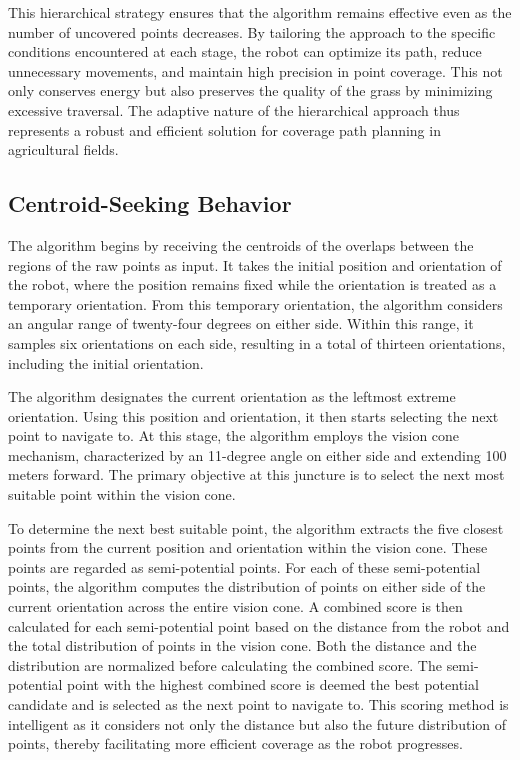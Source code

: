 \vspace{3mm}   


This hierarchical strategy ensures that the algorithm remains effective even as the number of uncovered points decreases. By tailoring the approach to the specific conditions encountered at each stage, the robot can optimize its path, reduce unnecessary movements, and maintain high precision in point coverage. This not only conserves energy but also preserves the quality of the grass by minimizing excessive traversal. The adaptive nature of the hierarchical approach thus represents a robust and efficient solution for coverage path planning in agricultural fields. 





\subsection{Centroid-Seeking Behavior}


The algorithm begins by receiving the centroids of the overlaps between the regions of the raw points as input. It takes the initial position and orientation of the robot, where the position remains fixed while the orientation is treated as a temporary orientation. From this temporary orientation, the algorithm considers an angular range of twenty-four degrees on either side. Within this range, it samples six orientations on each side, resulting in a total of thirteen orientations, including the initial orientation. 

\vspace{3mm}   

The algorithm designates the current orientation as the leftmost extreme orientation. Using this position and orientation, it then starts selecting the next point to navigate to. At this stage, the algorithm employs the vision cone mechanism, characterized by an 11-degree angle on either side and extending 100 meters forward. The primary objective at this juncture is to select the next most suitable point within the vision cone.

\vspace{3mm}  

To determine the next best suitable point, the algorithm extracts the five closest points from the current position and orientation within the vision cone. These points are regarded as semi-potential points. For each of these semi-potential points, the algorithm computes the distribution of points on either side of the current orientation across the entire vision cone. A combined score is then calculated for each semi-potential point based on the distance from the robot and the total distribution of points in the vision cone. Both the distance and the distribution are normalized before calculating the combined score. The semi-potential point with the highest combined score is deemed the best potential candidate and is selected as the next point to navigate to. This scoring method is intelligent as it considers not only the distance but also the future distribution of points, thereby facilitating more efficient coverage as the robot progresses.

